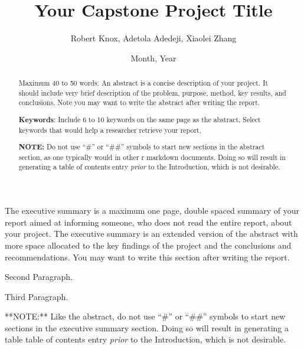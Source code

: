 \documentclass[12pt,oneside]{chicagocapstone}
\title{Your Capstone Project Title}
\author{Robert Knox, Adetola Adedeji, Xiaolei Zhang}
\date{Month, Year} %
\begin{document}
  \maketitle

\frontmatter %
\pagestyle{empty} %


  \begin{abstract}
    Maximum 40 to 50 words. An abstract is a concise description of your
    project. It should include very brief description of the problem,
    purpose, method, key results, and conclusions. Note you may want to
    write the abstract after writing the report.
    
    \bigskip  \bigskip
    \bigskip
    
    \textbf{Keywords}: Include 6 to 10 keywords on the same page as the
    abstract. Select keywords that would help a researcher retrieve your
    report.
    
    \bigskip  \bigskip
    \bigskip
    
    \textbf{NOTE:} Do not use ``\#'' or ``\#\#'' symbols to start new
    sections in the abstract section, as one typically would in other r
    markdown documents. Doing so will result in generating a table of
    contents entry \emph{prior} to the Introduction, which is not desirable.
  \end{abstract}
  \begin{executive}
    The executive summary is a maximum one page, double spaced summary of
    your report aimed at informing someone, who does not read the entire
    report, about your project. The executive summary is an extended version
    of the abstract with more space allocated to the key findings of the
    project and the conclusions and recommendations. You may want to write
    this section after writing the report.
    
    Second Paragraph.
    
    Third Paragraph.
    
    \bigskip
    \bigskip
    \bigskip
    **NOTE:** Like the abstract, do not use ``\#'' or ``\#\#'' symbols to
    start new sections in the executive summary section. Doing so will
    result in generating a table table of contents entry \emph{prior} to the
    Introduction, which is not desirable.
  \end{executive}
\end{document}
